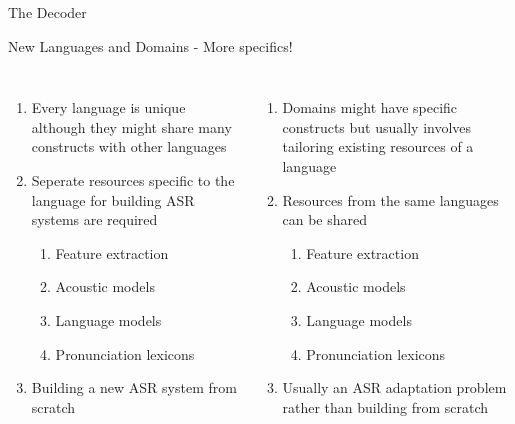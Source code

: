\begin{frame}{The Decoder}
%
\end{frame}

\begin{frame}{New Languages and Domains - More specifics!}
\begin{columns}[T]
\column{2in}
\centering
{\color{orange}{New Languages}}
\begin{enumerate}
\item Every language is \alert{unique} although they might share many constructs with other languages
\item \alert{Seperate resources} specific to the language for building ASR systems are required
\begin{enumerate}
\item Feature extraction
\item Acoustic models
\item Language models
\item Pronunciation lexicons
\end{enumerate}
\item \alert{Building a new ASR system from scratch}
\end{enumerate}
\column{2in}
\centering
{\color{ForestGreen}{New Domains}}
\begin{enumerate}
\item Domains might have specific constructs but usually involves \alert{tailoring existing resources} of a language
\item Resources from the same languages can be \alert{shared}
\begin{enumerate}
\item Feature extraction
\item Acoustic models
\item Language models
\item Pronunciation lexicons
\end{enumerate}
\item Usually \alert{an ASR adaptation problem} rather than building from scratch
\end{enumerate}
\end{columns}
\end{frame}
